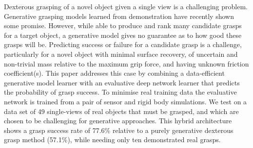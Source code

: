 Dexterous grasping of a novel object given a single view is a challenging problem. Generative grasping models learned from demonstration have recently shown some promise. However, while able to produce and rank many candidate grasps for a target object, a generative model gives no guarantee as to how good these grasps will be. Predicting success or failure for a candidate grasp is a challenge, particularly for a novel object with minimal surface recovery, of uncertain and non-trivial mass relative to the maximum grip force, and having unknown friction coefficient(s). This paper addresses this case by combining a data-efficient generative model learner with an evaluative deep network learner that predicts the probability of grasp success. To minimise real training data the evaluative network is trained from a pair of sensor and rigid body simulations. We test on a data set of 49 single-views of real objects that must be grasped, and which are chosen to be challenging for generative approaches. This hybrid architecture shows a grasp success rate of 77.6\% relative to a purely generative dexterous grasp method (57.1\%), while needing only ten demonstrated real grasps.